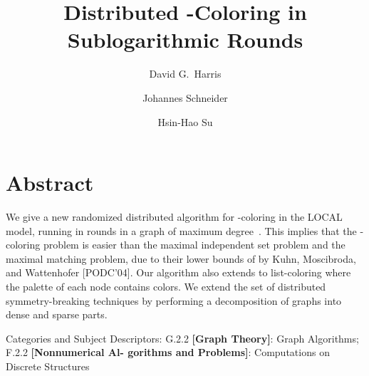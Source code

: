 \documentclass[11pt]{amsart}
\begin{document}
\author[David G. Harris and Johannes Schneider and Hsin-Hao Su]{
{\sc David G.~Harris}
\and
{\sc Johannes Schneider}
\and
{\sc Hsin-Hao Su}
}

\setcounter{footnote}{0}


\addtocounter{footnote}{1}

\addtocounter{footnote}{1}

\addtocounter{footnote}{1}

\addtocounter{footnote}{1}

\title{Distributed -Coloring in Sublogarithmic Rounds}



\maketitle
\section*{Abstract} \label{sec:Abstract}
\noindent
 We give a new randomized distributed algorithm for -coloring in the LOCAL model, running in  rounds in a graph of maximum degree~. This implies that the -coloring problem is easier than the maximal independent set problem and the maximal matching problem, due to their lower bounds of  by Kuhn, Moscibroda, and Wattenhofer [PODC'04]. Our algorithm also extends to list-coloring where the palette of each node contains  colors. We extend the set of distributed symmetry-breaking techniques by performing a decomposition of graphs into dense and sparse parts.



\bigskip

\noindent Categories and Subject Descriptors: G.2.2 \textbf{[Graph Theory]}: Graph Algorithms; F.2.2 \textbf{[Nonnumerical Al-
gorithms and Problems]}: Computations on Discrete Structures
\end{document}
